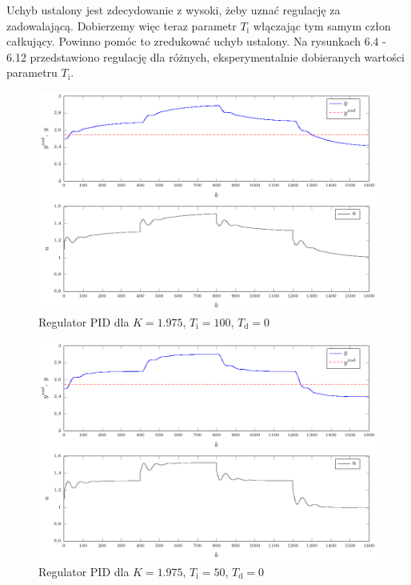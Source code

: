 Uchyb ustalony jest zdecydowanie z wysoki, żeby uznać regulację za zadowalającą. Dobierzemy więc teraz parametr $T_{\mathrm{i}}$ włączając tym samym człon całkujący. Powinno pomóc to zredukować uchyb ustalony. Na rysunkach 6.4 - 6.12 przedstawiono regulację dla różnych, eksperymentalnie dobieranych wartości parametru $T_{\mathrm{i}}$.

\begin{figure}[tb] 
\centering 
\includegraphics[scale=1]{rysunki/zapisz_pdf/PID_K=1.975_Ti=100.00_Td=0.00.pdf} 
\caption{Regulator PID dla $K=\num{1.975}$, $T_{\mathrm{i}}=100$, $T_{\mathrm{d}}=0$} 
\label{r_pgfplots_PID_K=1.975_Ti=100.00_Td=0.00} 
\end{figure}

\begin{figure}[tb] 
\centering 
\includegraphics[scale=1]{rysunki/zapisz_pdf/PID_K=1.975_Ti=50.00_Td=0.00.pdf} 
\caption{Regulator PID dla $K=\num{1.975}$, $T_{\mathrm{i}}=50$, $T_{\mathrm{d}}=0$} 
\label{r_pgfplots_PID_K=1.975_Ti=50.00_Td=0.00} 
\end{figure}

